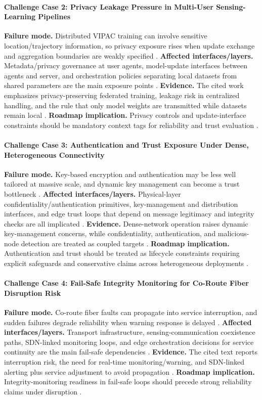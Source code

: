 \documentclass[letterpaper,journal]{IEEEtran}
\begin{document}
\paragraph{Challenge Case 2: Privacy Leakage Pressure in Multi-User Sensing-Learning Pipelines}
\textbf{Failure mode.} Distributed VIPAC training can involve sensitive location/trajectory information, so privacy exposure rises when update exchange and aggregation boundaries are weakly specified \cite{O_ISAC_039}. \textbf{Affected interfaces/layers.} Metadata/privacy governance at user agents, model-update interfaces between agents and server, and orchestration policies separating local datasets from shared parameters are the main exposure points \cite{O_ISAC_039}. \textbf{Evidence.} The cited work emphasizes privacy-preserving federated training, leakage risk in centralized handling, and the rule that only model weights are transmitted while datasets remain local \cite{O_ISAC_039}. \textbf{Roadmap implication.} Privacy controls and update-interface constraints should be mandatory context tags for reliability and trust evaluation \cite{O_ISAC_039}.

\paragraph{Challenge Case 3: Authentication and Trust Exposure Under Dense, Heterogeneous Connectivity}
\textbf{Failure mode.} Key-based encryption and authentication may be less well tailored at massive scale, and dynamic key management can become a trust bottleneck \cite{O_ISAC_156}. \textbf{Affected interfaces/layers.} Physical-layer confidentiality/authentication primitives, key-management and distribution interfaces, and edge trust loops that depend on message legitimacy and integrity checks are all implicated \cite{O_ISAC_156}. \textbf{Evidence.} Dense-network operation raises dynamic key-management concerns, while confidentiality, authentication, and malicious-node detection are treated as coupled targets \cite{O_ISAC_156}. \textbf{Roadmap implication.} Authentication and trust should be treated as lifecycle constraints requiring explicit safeguards and conservative claims across heterogeneous deployments \cite{O_ISAC_156}.

\paragraph{Challenge Case 4: Fail-Safe Integrity Monitoring for Co-Route Fiber Disruption Risk}
\textbf{Failure mode.} Co-route fiber faults can propagate into service interruption, and sudden failures degrade reliability when warning response is delayed \cite{O_ISAC_041}. \textbf{Affected interfaces/layers.} Transport infrastructure, sensing-communication coexistence paths, SDN-linked monitoring loops, and edge orchestration decisions for service continuity are the main fail-safe dependencies \cite{O_ISAC_041}. \textbf{Evidence.} The cited text reports interruption risk, the need for real-time monitoring/warning, and SDN-linked alerting plus service adjustment to avoid propagation \cite{O_ISAC_041}. \textbf{Roadmap implication.} Integrity-monitoring readiness in fail-safe loops should precede strong reliability claims under disruption \cite{O_ISAC_041}.
\end{document}
